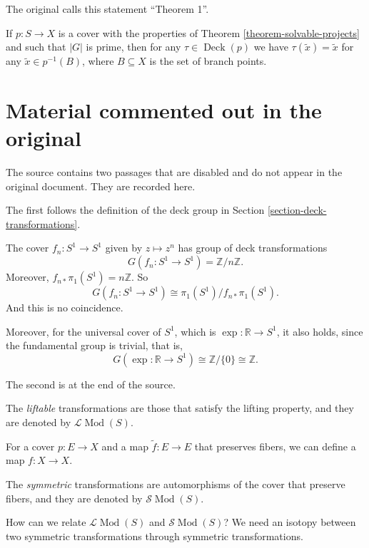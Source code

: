 The original calls this statement
``Theorem 1''.

\begin{lemma}
\label{lemma-prime-order}
If $p:S\to X$ is a cover with the
properties of
Theorem \ref{theorem-solvable-projects}
and such that $|G|$ is prime, then for
any $\tau\in\operatorname{Deck}(p)$ we
have $\tau(\tilde{x})=\tilde{x}$ for any
$\tilde{x}\in p^{-1}(B)$, where
$B\subseteq X$ is the set of branch
points.
\end{lemma}

\section{Material commented out in the
original}
\label{section-commented-out}

\noindent
The source contains two passages that
are disabled and do not appear in the
original document. They are recorded
here.

The first follows the definition of the
deck group in
Section
\ref{section-deck-transformations}.

\begin{example}
\label{example-deck-circle}
The cover $f_n:S^1\to S^1$ given by
$z\mapsto z^n$ has group of deck
transformations
$$
G(f_n:S^1\to S^1)
=\mathbb{Z}/n\mathbb{Z}.
$$
Moreover,
$f_{n*}\pi_1(S^1)=n\mathbb{Z}$. So
$$
G(f_n:S^1\to S^1)\cong
\pi_1(S^1)/f_{n*}\pi_1(S^1).
$$
And this is no coincidence.

Moreover, for the universal cover of
$S^1$, which is
$\exp:\mathbb{R}\to S^1$, it also holds,
since the fundamental group is trivial,
that is,
$$
G(\exp:\mathbb{R}\to S^1)\cong
\mathbb{Z}/\{0\}\cong\mathbb{Z}.
$$
\end{example}

The second is at the end of the source.

The {\it liftable} transformations are
those that satisfy the lifting property,
and they are denoted by
$\mathcal{L}\operatorname{Mod}(S)$.

\begin{remark}
\label{remark-descend}
For a cover $p:E\to X$ and a map
$\tilde{f}:E\to E$ that preserves
fibers, we can define a map
$f:X\to X$.
\end{remark}

The {\it symmetric} transformations are
automorphisms of the cover that preserve
fibers, and they are denoted by
$\mathcal{S}\operatorname{Mod}(S)$.

How can we relate
$\mathcal{L}\operatorname{Mod}(S)$ and
$\mathcal{S}\operatorname{Mod}(S)$? We
need an isotopy between two symmetric
transformations through symmetric
transformations.

